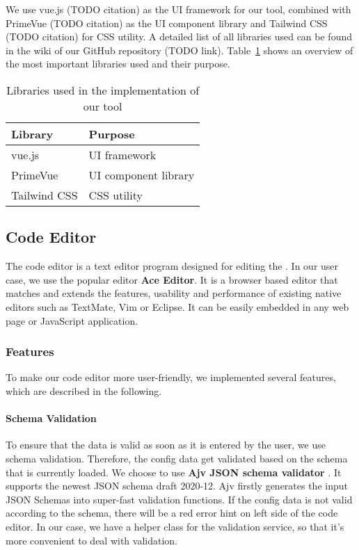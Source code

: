 We use vue.js (TODO citation) as the UI framework for our tool, combined with PrimeVue (TODO citation) as the UI component library and Tailwind CSS (TODO citation) for CSS utility.
A detailed list of all libraries used can be found in the wiki of our GitHub repository (TODO link).
Table~\ref{tab:libraries} shows an overview of the most important libraries used and their purpose.

\begin{table}[!t]
    \caption{Libraries used in the implementation of our tool}
    \label{tab:libraries}
    \centering
    \begin{tabular}{ll}
        \toprule
        \textbf{Library} & \textbf{Purpose}     \\
        \midrule
        vue.js           & UI framework         \\
        PrimeVue         & UI component library \\
        Tailwind CSS     & CSS utility          \\
        \bottomrule
    \end{tabular}
\end{table}

\subsection{Code Editor}\label{subsec:code-editor}

The code editor is a text editor program designed for editing the \cfgfiles.
In our user case, we use the popular editor \textbf{Ace Editor}. \cite{Ace-Editor}
It is a browser based editor that matches and extends the features, usability and performance of existing native editors such as TextMate, Vim or Eclipse.
It can be easily embedded in any web page or JavaScript application.

\subsubsection{Features}

To make our code editor more user-friendly, we implemented several features, which are described in the following.

\paragraph{Schema Validation}
To ensure that the data is valid as soon as it is entered by the user, we use schema validation.
Therefore, the config data get validated based on the schema that is currently loaded.
We choose to use \textbf{Ajv JSON schema validator} \cite{ajv-validator}.
It supports the newest JSON schema draft 2020-12.
Ajv firstly generates the input JSON Schemas into super-fast validation functions.
If the config data is not valid according to the schema, there will be a red error hint on left side of the code editor.
In our case, we have a helper class for the validation service, so that it's more convenient to deal with validation.

